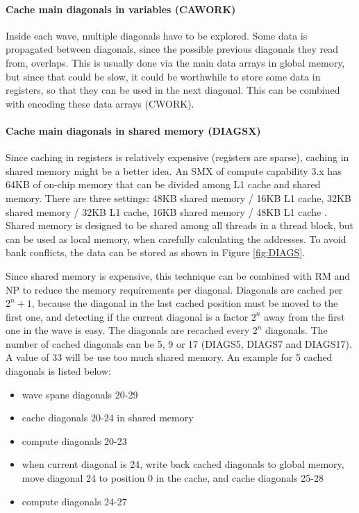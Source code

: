 \documentclass[../thesis.tex]{subfiles}
\begin{document}
\paragraph{Cache main diagonals in variables (CAWORK)}
Inside each wave, multiple diagonals have to be explored.
Some data is propagated between diagonals, since the possible previous diagonals they read from, overlaps.
This is usually done via the main data arrays in global memory, but since that could be slow, it could be worthwhile to store some data in registers, so that they can be used in the next diagonal.
This can be combined with encoding these data arrays (CWORK).

\paragraph{Cache main diagonals in shared memory (DIAGSX)}
Since caching in registers is relatively expensive (registers are sparse), caching in shared memory might be a better idea.
An SMX of compute capability 3.x has 64KB of on-chip memory that can be divided among L1 cache and shared memory.
There are three settings: 48KB shared memory / 16KB L1 cache, 32KB shared memory / 32KB L1 cache, 16KB shared memory / 48KB L1 cache \cite{shared_mem}.
Shared memory is designed to be shared among all threads in a thread block, but can be used as local memory, when carefully calculating the addresses.
To avoid bank conflicts, the data can be stored as shown in Figure \ref{fig:DIAGS}.


Since shared memory is expensive, this technique can be combined with RM and NP to reduce the memory requirements per diagonal.
\newpage
Diagonals are cached per $2^n+1$, because the diagonal in the last cached position must be moved to the first one, and detecting if the current diagonal is a factor $2^n$ away from the first one in the wave is easy.
The diagonals are recached every $2^n$ diagonals.
The number of cached diagonals can be 5, 9 or 17 (DIAGS5, DIAGS7 and DIAGS17).
A value of 33 will be use too much shared memory.
An example for 5 cached diagonals is listed below:

\begin{samepage}
\begin{itemize}
\item wave spans diagonals 20-29
\item cache diagonals 20-24 in shared memory
\item compute diagonals 20-23
\item when current diagonal is 24, write back cached diagonals to global memory, move diagonal 24 to position 0 in the cache, and cache diagonals 25-28
\item compute diagonals 24-27
\end{itemize}
\end{samepage}
\end{document}
